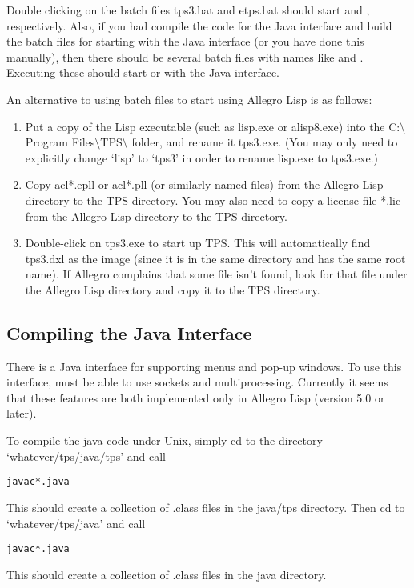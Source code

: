 Double clicking on the batch files tps3.bat and etps.bat should start
{\TPS} and {\ETPS}, respectively.  Also, if you had 
compile the code for
the Java interface and build the batch files for starting
{\TPS} with the Java interface (or you have done this manually),
then there should be several batch
files with names like  and .
Executing these should start {\TPS} or {\ETPS} with the Java interface.

An alternative to using batch files to start {\TPS} using Allegro Lisp is as follows:

\begin{enumerate}
\item Put a copy of the Lisp executable (such as lisp.exe or alisp8.exe) into the
C:\(\setminus\)Program Files\(\setminus\)TPS\(\setminus\) folder, and rename it tps3.exe.
(You may only need to explicitly change `lisp' to `tps3'
in order to rename lisp.exe to tps3.exe.)

\item Copy acl*.epll or acl*.pll (or similarly named files)
from the Allegro Lisp directory to the TPS directory.
You may also need to copy a license file *.lic
from the Allegro Lisp directory to the TPS directory.

\item Double-click on tps3.exe to start up TPS.  This will automatically
find tps3.dxl as the image (since it is in the same directory and has the
same root name).  If Allegro complains that some file isn't found,
look for that file under the Allegro Lisp directory and copy it to
the TPS directory.

\end{enumerate}

\subsection{Compiling the Java Interface}\label{compiling-java}

There is a Java interface for {\TPS} supporting menus and pop-up
windows.
To use this interface, {\TPS} must be able to use sockets
and multiprocessing.
Currently it seems that these features are both
implemented only in
Allegro Lisp (version 5.0 or later).

To compile the java code
under Unix,
simply cd to the directory `whatever/tps/java/tps' and call
\begin{alltt}
javac *.java
\end{alltt}
This should create a collection of .class files
in the java/tps directory.  Then cd to `whatever/tps/java'
and call
\begin{alltt}
javac *.java
\end{alltt}
This should create a collection of .class files
in the java directory.

